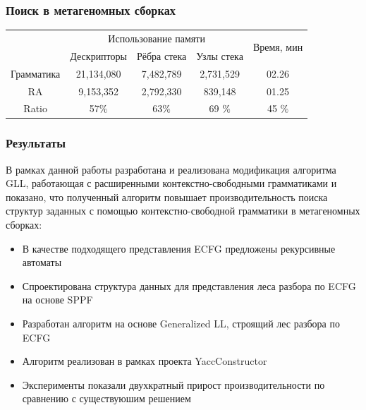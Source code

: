 \documentclass{beamer}
\begin{document}
	\begin{frame} 
		\frametitle{Поиск в метагеномных сборках} 
		\begin{center}
		\vspace{40pt}
		\begin{tabular}{ | c | c | c | c | c | }
			\hline
			\multirow{2}{*}[-1ex]{} &\multicolumn{3}{c|}{Использование памяти} & \multirow{2}{*}[-1ex]{Время, мин } \\
			\cline{2-4}
			             &  Дескрипторы & Рёбра стека & Узлы стека &   \\ \hline
			Грамматика  &  21,134,080       & 7,482,789      & 2,731,529      & 02.26  \\ \hline
			RA &  9,153,352        &  2,792,330     & 839,148        & 01.25  \\ \hline \hline
			Ratio   &  57$\%$       & 63$\%$     & 69 $\%$    &  45 $\%$ \\ \hline
		\end{tabular}
		\end{center}
	\end{frame}

	\begin{frame} 
		\frametitle{Результаты}
		В рамках данной работы разработана и реализована модификация алгоритма GLL,
		работающая с расширенными контекстно-свободными грамматиками и показано, что полученный
		алгоритм повышает производительность поиска структур заданных с помощью контекстно-свободной
		грамматики в метагеномных сборках:
		\begin{itemize}
			\item В качестве подходящего представления ECFG предложены рекурсивные автоматы
			\item Спроектирована структура данных для представления леса разбора по ECFG на основе SPPF
			\item Разработан алгоритм на основе Generalized LL, строящий лес разбора по ECFG
			\item Алгоритм реализован в рамках проекта YaccConstructor
			\item Эксперименты показали двухкратный прирост производительности по сравнению с существуюшим решением 
		\end{itemize}		
	\end{frame}
\end{document}

